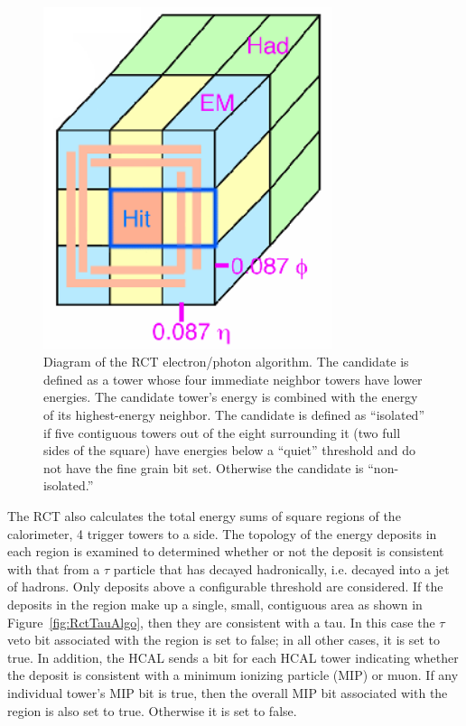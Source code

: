  \begin{figure}[htb]
  \begin{center}
    \includegraphics[width=240pt]{Figures/RCT-EG-algo.png} 
  \end{center}
  \caption[\fixspacing Diagram of the RCT electron/photon algorithm]{
    \fixspacing Diagram of the RCT electron/photon algorithm. 
    The candidate is defined as a tower whose four 
    immediate neighbor towers have lower energies.  
    The candidate tower's energy is combined with 
    the energy of its highest-energy neighbor.  
    The candidate is defined as ``isolated'' if 
    five contiguous towers out of the eight 
    surrounding it (two full sides of the square) 
    have energies below a ``quiet'' threshold 
    and do not have the fine grain bit set.  
    Otherwise the candidate is ``non-isolated.''  
  }
  \label{fig:RctEgAlgo}
 \end{figure}

The RCT also calculates the total energy sums 
of square regions of the calorimeter, 
4 trigger towers to a side.  
The topology of the energy deposits in each region 
is examined to determined whether or not the 
deposit is consistent with that from 
a $\tau$ particle that has decayed hadronically, 
i.e. decayed into a jet of hadrons.  
Only deposits above a configurable threshold 
are considered.  
If the deposits in the region make up a 
single, small, contiguous area as shown in 
Figure~\ref{fig:RctTauAlgo},
then they are consistent with a tau.  
In this case the $\tau$ veto bit associated 
with the region is set to false; 
in all other cases, it is set to true.  
In addition, the HCAL sends a bit for each 
HCAL tower indicating whether the deposit 
is consistent with a minimum ionizing particle 
(MIP) or muon.  %
If any individual tower's MIP bit is true, 
then the overall MIP bit associated with the region 
is also set to true.  
Otherwise it is set to false.  

